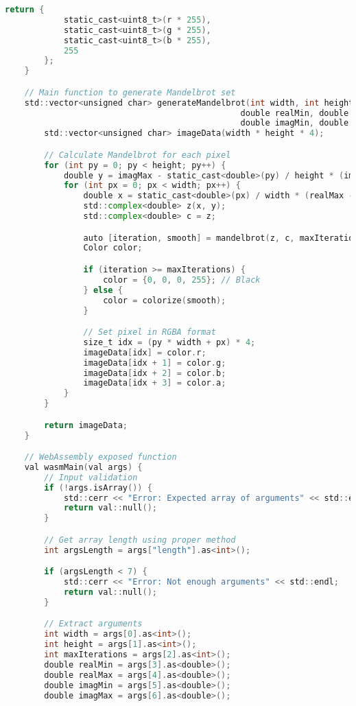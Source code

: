 \begin{lstlisting}[language=go, frame=tb, caption={Mandelbrot Set Calculation (WASM build)}]
        return {
            static_cast<uint8_t>(r * 255),
            static_cast<uint8_t>(g * 255),
            static_cast<uint8_t>(b * 255),
            255
        };
    }

    // Main function to generate Mandelbrot set
    std::vector<unsigned char> generateMandelbrot(int width, int height, int maxIterations,
                                                double realMin, double realMax,
                                                double imagMin, double imagMax) {
        std::vector<unsigned char> imageData(width * height * 4);

        // Calculate Mandelbrot for each pixel
        for (int py = 0; py < height; py++) {
            double y = imagMax - static_cast<double>(py) / height * (imagMax - imagMin);
            for (int px = 0; px < width; px++) {
                double x = static_cast<double>(px) / width * (realMax - realMin) + realMin;
                std::complex<double> z(x, y);
                std::complex<double> c = z;

                auto [iteration, smooth] = mandelbrot(z, c, maxIterations);
                Color color;

                if (iteration >= maxIterations) {
                    color = {0, 0, 0, 255}; // Black
                } else {
                    color = colorize(smooth);
                }

                // Set pixel in RGBA format
                size_t idx = (py * width + px) * 4;
                imageData[idx] = color.r;
                imageData[idx + 1] = color.g;
                imageData[idx + 2] = color.b;
                imageData[idx + 3] = color.a;
            }
        }

        return imageData;
    }

    // WebAssembly exposed function
    val wasmMain(val args) {
        // Input validation
        if (!args.isArray()) {
            std::cerr << "Error: Expected array of arguments" << std::endl;
            return val::null();
        }

        // Get array length using proper method
        int argsLength = args["length"].as<int>();

        if (argsLength < 7) {
            std::cerr << "Error: Not enough arguments" << std::endl;
            return val::null();
        }

        // Extract arguments
        int width = args[0].as<int>();
        int height = args[1].as<int>();
        int maxIterations = args[2].as<int>();
        double realMin = args[3].as<double>();
        double realMax = args[4].as<double>();
        double imagMin = args[5].as<double>();
        double imagMax = args[6].as<double>();


\end{lstlisting}
